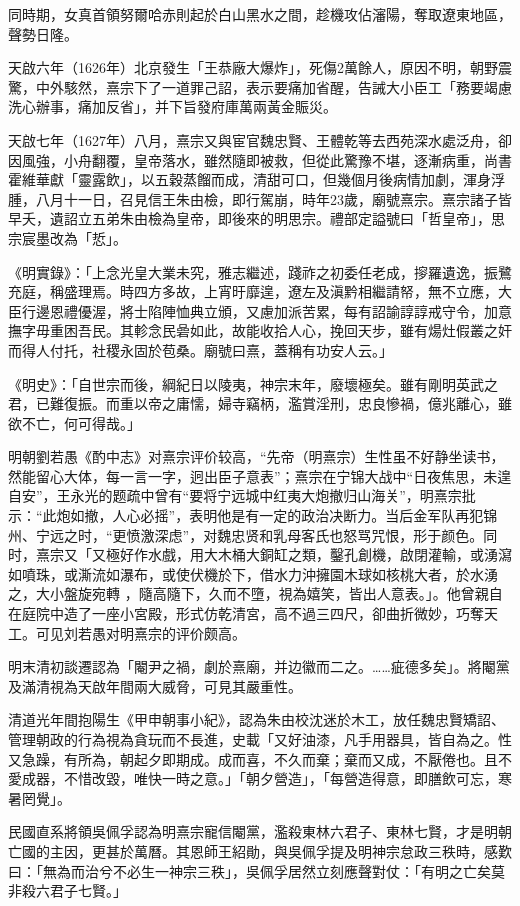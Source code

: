 同時期，女真首領努爾哈赤則起於白山黑水之間，趁機攻佔瀋陽，奪取遼東地區，聲勢日隆。

天啟六年（1626年）北京發生「王恭廠大爆炸」，死傷2萬餘人，原因不明，朝野震驚，中外駭然，熹宗下了一道罪己詔，表示要痛加省醒，告誡大小臣工「務要竭慮洗心辦事，痛加反省」，并下旨發府庫萬兩黃金賑災。

天啟七年（1627年）八月，熹宗又與宦官魏忠賢、王體乾等去西苑深水處泛舟，卻因風強，小舟翻覆，皇帝落水，雖然隨即被救，但從此驚豫不堪，逐漸病重，尚書霍維華獻「靈露飲」，以五穀蒸餾而成，清甜可口，但幾個月後病情加劇，渾身浮腫，八月十一日，召見信王朱由檢，即行駕崩，時年23歲，廟號熹宗。熹宗諸子皆早夭，遺詔立五弟朱由檢為皇帝，即後來的明思宗。禮部定謚號曰「哲皇帝」，思宗宸墨改為「悊」。

《明實錄》：「上念光皇大業未究，雅志繼述，踐祚之初委任老成，摉羅遺逸，振鷺充庭，稱盛理焉。時四方多故，上宵旴靡遑，遼左及滇黔相繼請帑，無不立應，大臣行邊恩禮優渥，將士陷陣恤典立頒，又慮加派苦累，每有詔諭諄諄戒守令，加意撫字毋重困吾民。其軫念民碞如此，故能收拾人心，挽回天步，雖有煬灶假叢之奸而得人付托，社稷永固於苞桑。廟號曰熹，蓋稱有功安人云。」

《明史》：「自世宗而後，綱紀日以陵夷，神宗末年，廢壞極矣。雖有剛明英武之君，已難復振。而重以帝之庸懦，婦寺竊柄，濫賞淫刑，忠良慘禍，億兆離心，雖欲不亡，何可得哉。」

明朝劉若愚《酌中志》对熹宗评价较高，“先帝（明熹宗）生性虽不好静坐读书，然能留心大体，每一言一字，迥出臣子意表”；熹宗在宁锦大战中“日夜焦思，未遑自安”，王永光的题疏中曾有“要将宁远城中红夷大炮撤归山海关”，明熹宗批示：“此炮如撤，人心必摇”，表明他是有一定的政治决断力。当后金军队再犯锦州、宁远之时，“更愤激深虑”，对魏忠贤和乳母客氏也怒骂咒恨，形于颜色。同时，熹宗又「又極好作水戲，用大木桶大銅缸之類，鑿孔創機，啟閉灌輸，或湧瀉如噴珠，或澌流如瀑布，或使伏機於下，借水力沖擁園木球如核桃大者，於水湧之，大小盤旋宛轉 ，隨高隨下，久而不墮，視為嬉笑，皆出人意表。」。他曾親自在庭院中造了一座小宮殿，形式仿乾清宮，高不過三四尺，卻曲折微妙，巧奪天工。可见刘若愚对明熹宗的评价颇高。

明末清初談遷認為「閹尹之禍，劇於熹廟，并边徽而二之。……疵德多矣」。將閹黨及滿清視為天啟年間兩大威脅，可見其嚴重性。

清道光年間抱陽生《甲申朝事小紀》，認為朱由校沈迷於木工，放任魏忠賢矯詔、管理朝政的行為視為貪玩而不長進，史載「又好油漆，凡手用器具，皆自為之。性又急躁，有所為，朝起夕即期成。成而喜，不久而棄；棄而又成，不厭倦也。且不愛成器，不惜改毀，唯快一時之意。」「朝夕營造」，「每營造得意，即膳飲可忘，寒暑罔覺」。

民國直系將領吳佩孚認為明熹宗寵信閹黨，濫殺東林六君子、東林七賢，才是明朝亡國的主因，更甚於萬曆。其恩師王紹勛，與吳佩孚提及明神宗怠政三秩時，感歎曰：「無為而治兮不必生一神宗三秩」，吳佩孚居然立刻應聲對仗：「有明之亡矣莫非殺六君子七賢。」

